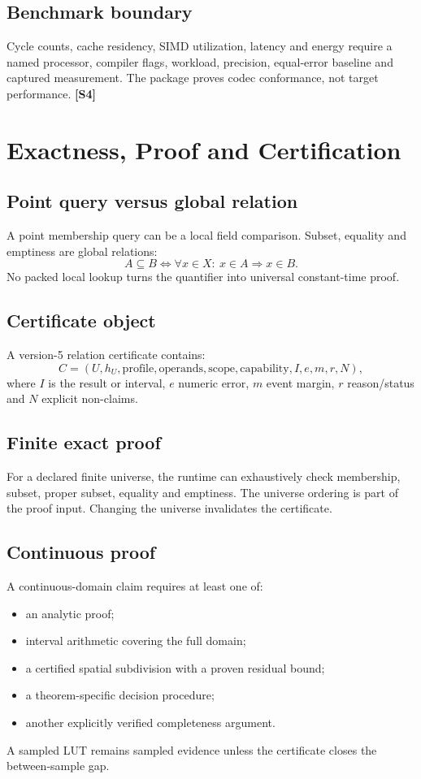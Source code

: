 \documentclass[11pt,a4paper]{article}
\newcommand{\source}[1]{\textcolor{UGTSPurple}{\textbf{[#1]}}}
\begin{document}
\subsection{Benchmark boundary}
Cycle counts, cache residency, SIMD utilization, latency and energy require a named processor, compiler flags, workload, precision, equal-error baseline and captured measurement. The package proves codec conformance, not target performance. \source{S4}

\section{Exactness, Proof and Certification}
\subsection{Point query versus global relation}
A point membership query can be a local field comparison. Subset, equality and emptiness are global relations:
\[
A\subseteq B\iff\forall x\in X:\ x\in A\Rightarrow x\in B.
\]
No packed local lookup turns the quantifier into universal constant-time proof.

\subsection{Certificate object}
A version-5 relation certificate contains:
\[
C=(U,h_U,\mathrm{profile},\mathrm{operands},\mathrm{scope},\mathrm{capability},I,e,m,r,N),
\]
where \(I\) is the result or interval, \(e\) numeric error, \(m\) event margin, \(r\) reason/status and \(N\) explicit non-claims.

\subsection{Finite exact proof}
For a declared finite universe, the runtime can exhaustively check membership, subset, proper subset, equality and emptiness. The universe ordering is part of the proof input. Changing the universe invalidates the certificate.

\subsection{Continuous proof}
A continuous-domain claim requires at least one of:
\begin{itemize}
\item an analytic proof;
\item interval arithmetic covering the full domain;
\item a certified spatial subdivision with a proven residual bound;
\item a theorem-specific decision procedure;
\item another explicitly verified completeness argument.
\end{itemize}
A sampled LUT remains sampled evidence unless the certificate closes the between-sample gap.
\end{document}
